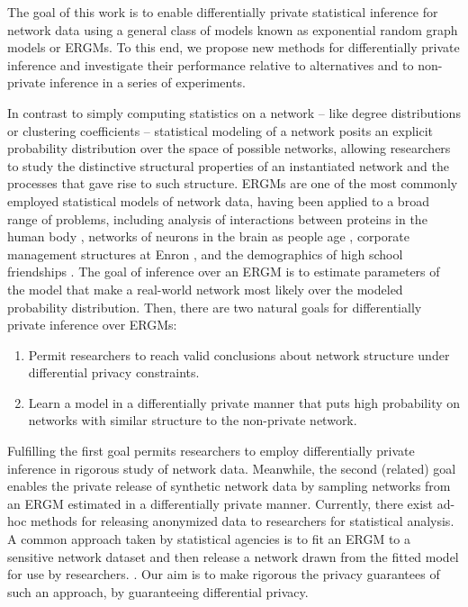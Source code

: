 The goal of this work is to enable differentially private statistical inference for network data using a general class of models known as exponential random graph models or ERGMs. To this end, we propose new methods for differentially private inference and investigate their performance relative to alternatives and to non-private inference in a series of experiments. 

In contrast to simply computing statistics on a network -- like degree distributions or clustering coefficients -- statistical modeling of a network posits an explicit probability distribution over the space of possible networks, allowing researchers to study the distinctive structural properties of an instantiated network and the processes that gave rise to such structure. ERGMs are one of the most commonly employed statistical models of network data, having been applied to a broad range of problems, including analysis of interactions between proteins in the human body \cite{EBB10}, networks of neurons in the brain as people age  \cite{Sin+16}, corporate management structures at Enron  \cite{UHH13}, and the demographics of high school friendships \cite{GKM09}. The goal of inference over an ERGM is to estimate parameters of the model that make a real-world network most likely over the modeled probability distribution. Then, there are two natural goals for differentially private inference over ERGMs:
\vspace{-1.5em}
\begin{enumerate}
	\item Permit researchers to reach valid conclusions about network structure under differential privacy constraints.
	\item Learn a model in a differentially private manner that puts high probability on networks with similar structure to the non-private network.
\end{enumerate}
\vspace{-1.5em}
Fulfilling the first goal permits researchers to employ differentially private inference in rigorous study of network data. Meanwhile, the second (related) goal enables the private release of synthetic network data by sampling networks from an ERGM estimated in a differentially private manner. Currently, there exist ad-hoc methods for releasing anonymized data to researchers for statistical analysis. A common approach taken by statistical agencies is to fit an ERGM to a sensitive network dataset and then release a network drawn from the fitted model for use by researchers. \cite{ergm}. Our aim is to make rigorous the privacy guarantees of such an approach, by guaranteeing differential privacy. 


